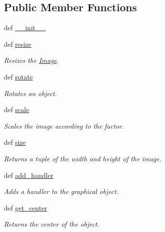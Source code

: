 \subsection*{Public Member Functions}
\begin{DoxyCompactItemize}
\item 
def \hyperlink{classcs110graphics_1_1Image_a3b7c128fa18d85ff4a7586fac04a1bc2}{\_\-\_\-init\_\-\_\-}
\item 
def \hyperlink{classcs110graphics_1_1Image_a0754151035bb2892f0cd3895b64488fa}{resize}
\begin{DoxyCompactList}\small\item\em Resizes the \hyperlink{classcs110graphics_1_1Image}{Image}. \item\end{DoxyCompactList}\item 
def \hyperlink{classcs110graphics_1_1Image_ac58717d68279e536cee608e2bdfc6aa8}{rotate}
\begin{DoxyCompactList}\small\item\em Rotates an object. \item\end{DoxyCompactList}\item 
def \hyperlink{classcs110graphics_1_1Image_a7a59fde33fe83916a4155fafb5cfb01e}{scale}
\begin{DoxyCompactList}\small\item\em Scales the image according to the factor. \item\end{DoxyCompactList}\item 
def \hyperlink{classcs110graphics_1_1Image_a4ff2da7a167a433f2c38f1e2e2fe7263}{size}
\begin{DoxyCompactList}\small\item\em Returns a tuple of the width and height of the image. \item\end{DoxyCompactList}\item 
def \hyperlink{classcs110graphics_1_1GraphicalObject_adb1af0d5a6baae3f9a08d21a3227c49f}{add\_\-handler}
\begin{DoxyCompactList}\small\item\em Adds a handler to the graphical object. \item\end{DoxyCompactList}\item 
def \hyperlink{classcs110graphics_1_1GraphicalObject_a062789c4cc9de38af32dcc4ff2058607}{get\_\-center}
\begin{DoxyCompactList}\small\item\em Returns the center of the object. \item\end{DoxyCompactList}\item 

\end{DoxyCompactItemize}
